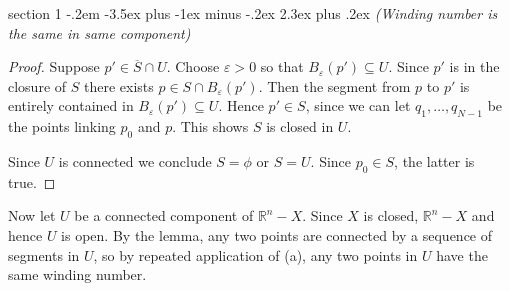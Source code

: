 \documentclass[12pt]{article}
\makeatletter
\theoremstyle{norm}
\newcommand{\R}[0]{\mathbb{R}}
\newcommand{\subeq}[0]{\subseteq}
\newcommand{\ep}[0]{\varepsilon}
\newcommand{\ol}[1]{\overline{#1}}
\newenvironment{problem}{\@startsection
       {section}
       {1}
       {-.2em}
       {-3.5ex plus -1ex minus -.2ex}
       {2.3ex plus .2ex}
       {\pagebreak[3]%
       \large\bf\noindent{Problem }
       }
       }
       {%
       }
\makeatother
\begin{document}
\begin{problem}{\it (Winding number is the same in same component)}
\begin{proof}
Suppose $p'\in \ol{S}\cap U$. Choose $\ep>0$ so that $B_{\ep}(p')\subeq U$. Since $p'$ is in the closure of $S$ there exists $p\in S\cap B_{\ep}(p')$. Then the segment from $p$ to $p'$ is entirely contained in $B_{\ep}(p')\subeq U$. Hence $p'\in S$, since we can let $q_1,\ldots, q_{N-1}$ be the points linking $p_0$ and $p$. This shows $S$ is closed in $U$.

Since $U$ is connected we conclude $S=\phi$ or $S=U$. Since $p_0\in S$, the latter is true.
\end{proof}
Now let $U$ be a connected component of $\R^n-X$. Since $X$ is closed, $\R^n-X$ and hence $U$ is open. By the lemma, any two points are connected by a sequence of segments in $U$, so by repeated application of (a), any two points in $U$ have the same winding number.
\end{problem}
\end{document}
